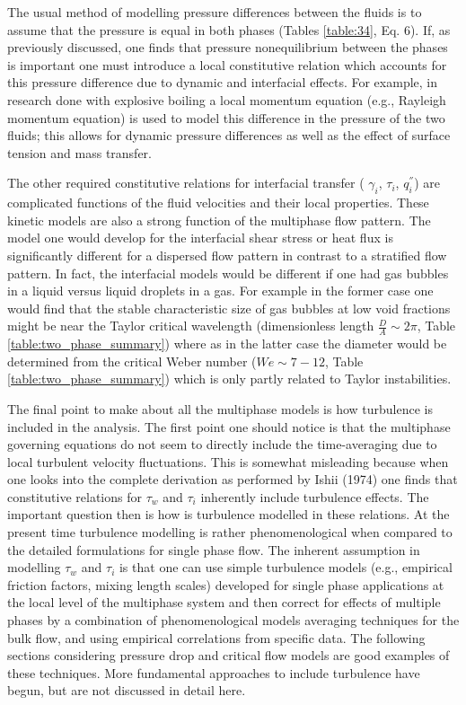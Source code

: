 The usual method of modelling pressure differences between the fluids is to assume that the pressure is equal in both phases (Tables \ref{table:34}, Eq. 6).
If, as previously discussed, one finds that pressure nonequilibrium between the phases is important one must introduce a local constitutive relation which accounts for this pressure difference due to dynamic and interfacial effects.
For example, in research done with explosive boiling a local momentum equation (e.g., Rayleigh momentum equation) is used to model this difference in the pressure of the two fluids; this allows for dynamic pressure differences as well as the effect of surface tension and mass transfer.

The other required constitutive relations for interfacial transfer ( $\gamma_i$, $\tau_i$, $q^{''}_i$) are complicated functions of the fluid velocities and their local properties.
These kinetic models are also a strong function of the multiphase flow pattern.
The model one would develop for the interfacial shear stress or heat flux is significantly different for a dispersed flow pattern in contrast to a stratified flow pattern.
In fact, the interfacial models would be different if one had gas bubbles in a liquid versus liquid droplets in a gas.
For example in the former case one would find that the stable characteristic size of gas bubbles at low void fractions might be near the Taylor critical wavelength (dimensionless length $\frac{D}{A} \sim 2\pi$, Table \ref{table:two_phase_summary}) where as in the latter case the diameter would be determined from the critical Weber number ($We \sim 7-12$, Table \ref{table:two_phase_summary}) which is only partly related to Taylor instabilities.

The final point to make about all the multiphase models is how turbulence is included in the analysis.
The first point one should notice is that the multiphase governing equations do not seem to directly include the time-averaging due to local turbulent velocity fluctuations.
This is somewhat misleading because when one looks into the complete derivation as performed by Ishii (1974) one finds that constitutive relations for $\tau_w$ and $\tau_i$ inherently include turbulence effects.
The important question then is how is turbulence modelled in these relations.
At the present time turbulence modelling is rather phenomenological when compared to the detailed formulations for single phase flow.
The inherent assumption in modelling $\tau_w$ and $\tau_i$ is that one can use simple turbulence models (e.g., empirical friction factors, mixing length scales) developed for single phase applications at the local level of the multiphase system and then correct for effects of multiple phases by a combination of phenomenological models averaging techniques for the bulk flow, and using empirical correlations from specific data.
The following sections considering pressure drop and critical flow models are good examples of these techniques.
More fundamental approaches to include turbulence have begun, but are not discussed in detail here.